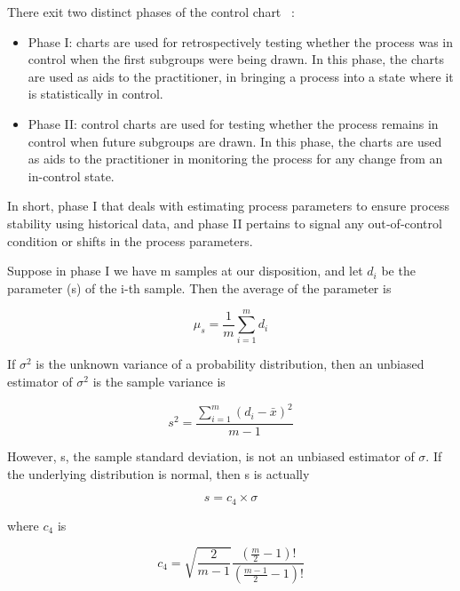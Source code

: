 There exit two distinct phases of the control chart
~\cite{bersimis2007multivariate}:

\begin{itemize}
\item Phase I: charts are used for retrospectively testing whether the process was in control when the first
subgroups were being drawn. In this phase, the charts are used as aids to the practitioner, in bringing a
process into a state where it is statistically in control.
\item Phase II: control charts are used for testing whether the process remains in control when future subgroups
are drawn. In this phase, the charts are used as aids to the practitioner in monitoring the process for any
change from an in-control state.
\end{itemize}

In short, phase I that deals with estimating process parameters to ensure process stability using historical data, and phase II pertains to signal
any out‐of‐control condition or shifts in the process parameters.

Suppose in phase I we have m samples at our disposition, and let $d_{i}$ be the parameter (s) of the i-th sample. Then the average of the parameter is


\begin{equation}
    \mu_{s}=\frac{1}{m} \sum_{i=1}^{m} d_{i}
    \label{equ:mu}
\end{equation}

If $\sigma^{2}$ is the unknown variance of a probability distribution, then an unbiased estimator of $\sigma^{2}$ is the sample variance is

\begin{equation}
    s^{2}=\frac{\sum_{i=1}^{m}\left(d_{i}-\bar{x}\right)^{2}}{m-1}
    \label{equ:sigma}
\end{equation}

However, s, the sample standard deviation, is not an unbiased estimator of $\sigma$. If the underlying distribution is normal, then s is actually

\begin{equation}
    s=c_4 \times \sigma
    \label{equ:s}
\end{equation}

where $c_4$ is 

\begin{equation}
    c_{4}=\sqrt{\frac{2}{m-1}} \frac{\left(\frac{m}{2}-1\right) !}{\left(\frac{m-1}{2}-1\right) !}
    \label{equ:c4}
\end{equation}


